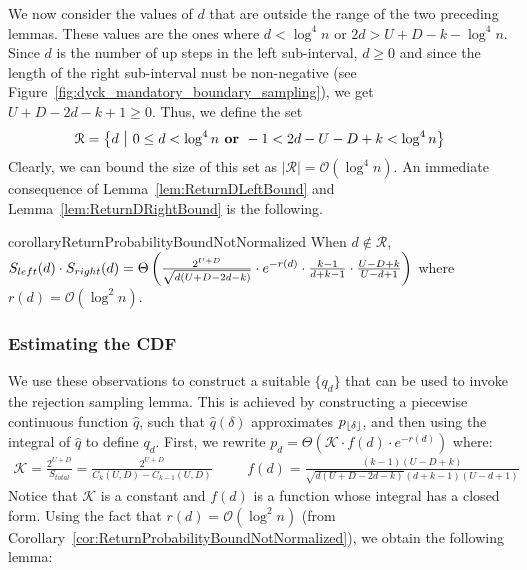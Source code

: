 We now consider the values of $d$ that are outside the range of the two preceding lemmas.
These values are the ones where $d < \log^4 n$ or $2d > U+D-k-\log^4 n$.
Since $d$ is the number of up steps in the left sub-interval, $d \ge 0$
and since the length of the right sub-interval nust be non-negative (see Figure~\ref{fig:dyck_mandatory_boundary_sampling}), we get $U+D-2d-k+1 \ge 0$.
Thus, we define the set
\begin{align}
\label{eq:SetDefinition}
    \mathcal R = \left\{ d\ \mathlarger|\ 0\le d < \log^4 n \textrm{\textbf{\ or\ }} -1 < 2d-U-D+k < \log^4 n \right\}
\end{align}
Clearly, we can bound the size of this set as $|\mathcal R| = \mathcal O(\log^4 n)$.
An immediate consequence of Lemma~\ref{lem:ReturnDLeftBound} and Lemma~\ref{lem:ReturnDRightBound} is the following.

\begin{restatable}{corollary}{ReturnProbabilityBoundNotNormalized}
\label{cor:ReturnProbabilityBoundNotNormalized}
When $d\not \in \mathcal R$,
$S_{left}(d)\cdot S_{right}(d)
= \Theta\left( \frac{2^{U+D}}{\sqrt{d(U+D-2d-k)}}\cdot \mathlarger e^{-r(d)} \cdot \frac{k-1}{d+k-1}\cdot\frac{U-D+k}{U-d+1}\right)$
where $r(d)=\mathcal O(\log^2 n)$.
\end{restatable}



\subsubsection{Estimating the CDF}
\label{sec:estimating_the_cdf}
We use these observations to construct a suitable $\{ q_d\}$ that can be used to invoke the rejection sampling lemma.
This is achieved by constructing a piecewise continuous function $\hat q$, such that $\hat q(\delta)$ approximates $p_{\lfloor\delta\rfloor}$,
and then using the integral of $\hat q$ to define $q_d$.
First, we rewrite $p_d = \Theta\left(\mathcal K \cdot f(d)\cdot e^{-r(d)}\right)$ where:
{\small
    \begin{align}
    \label{eq:dyck_integrable_function}
        \mathcal K = \frac{2^{U+D}}{S_{total}} = \frac{2^{U+D}}{C_k(U,D)-C_{k-1}(U,D)}\ \ \ \
        &&f(d) = \frac{(k-1)(U-D+k)}{\sqrt{d(U+D-2d-k)}(d+k-1)(U-d+1)}
    \end{align}}
Notice that $\mathcal K$ is a constant and $f(d)$ is a function whose integral has a closed form.
Using the fact that $r(d) = \mathcal O(\log^2 n)$ (from Corollary~\ref{cor:ReturnProbabilityBoundNotNormalized}), we obtain the following lemma:

